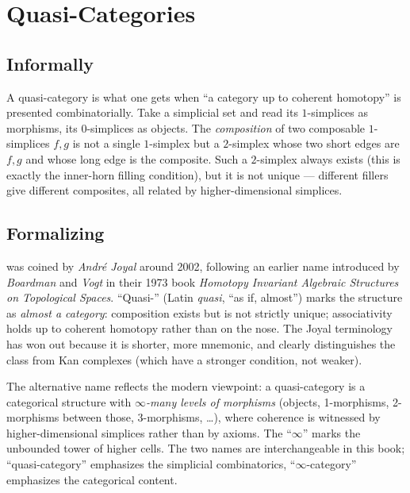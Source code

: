 \section{Quasi-Categories}
\label{sec:quasi-categories}

\subsection{Informally}

A quasi-category is what one gets when ``a category up to coherent
homotopy'' is presented combinatorially. Take a simplicial set and read
its $1$-simplices as morphisms, its $0$-simplices as objects. The
\emph{composition} of two composable $1$-simplices $f, g$ is not a single
$1$-simplex but a $2$-simplex whose two short edges are $f, g$ and whose
long edge is the composite. Such a $2$-simplex always exists (this is
exactly the inner-horn filling condition), but it is not unique — different
fillers give different composites, all related by higher-dimensional
simplices.

\subsection{Formalizing}

\begin{nameorigin}
 was coined by \emph{André Joyal} around 2002,
following an earlier name  introduced by
\emph{Boardman} and \emph{Vogt} in their 1973 book \emph{Homotopy
Invariant Algebraic Structures on Topological Spaces}. ``Quasi-''
(Latin \emph{quasi}, ``as if, almost'') marks the structure as
\emph{almost a category}: composition exists but is not strictly
unique; associativity holds up to coherent homotopy rather than on the
nose. The Joyal terminology has won out because it is shorter, more
mnemonic, and clearly distinguishes the class from Kan complexes (which
have a stronger condition, not weaker).
\end{nameorigin}

\begin{nameorigin}
The alternative name  reflects the modern
viewpoint: a quasi-category is a categorical structure with
\emph{$\infty$-many levels of morphisms} (objects, 1-morphisms,
2-morphisms between those, 3-morphisms, \ldots), where coherence is
witnessed by higher-dimensional simplices rather than by axioms. The
``$\infty$'' marks the unbounded tower of higher cells. The two names
are interchangeable in this book; ``quasi-category'' emphasizes the
simplicial combinatorics, ``$\infty$-category'' emphasizes the
categorical content.
\end{nameorigin}

